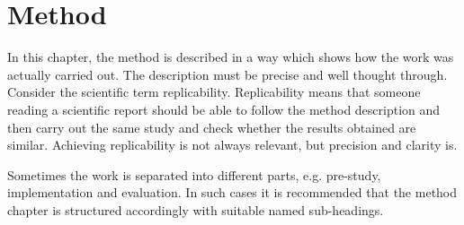 \chapter{Method}
\label{cha:method}












In this chapter, the method is described in a way which shows how the
work was actually carried out. The description must be precise and
well thought through. Consider the scientific term
replicability. Replicability means that someone reading a scientific
report should be able to follow the method description and then carry
out the same study and check whether the results obtained are
similar. Achieving replicability is not always relevant, but precision
and clarity is.

Sometimes the work is separated into different parts, e.g.  pre-study,
implementation and evaluation. In such cases it is recommended that
the method chapter is structured accordingly with suitable named
sub-headings.
